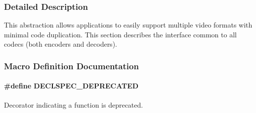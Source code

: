 \subsubsection{Detailed Description}
This abstraction allows applications to easily support multiple video formats with minimal code duplication. This section describes the interface common to all codecs (both encoders and decoders). 

\subsubsection{Macro Definition Documentation}
\hypertarget{group__codec_gab61b56b074706ee8423d864b511212ad}{
\paragraph[{D\+E\+C\+L\+S\+P\+E\+C\+\_\+\+D\+E\+P\+R\+E\+C\+A\+T\+E\+D}]{\setlength{\rightskip}{0pt plus 5cm}\#define D\+E\+C\+L\+S\+P\+E\+C\+\_\+\+D\+E\+P\+R\+E\+C\+A\+T\+E\+D}}\label{group__codec_gab61b56b074706ee8423d864b511212ad}


Decorator indicating a function is deprecated. 

